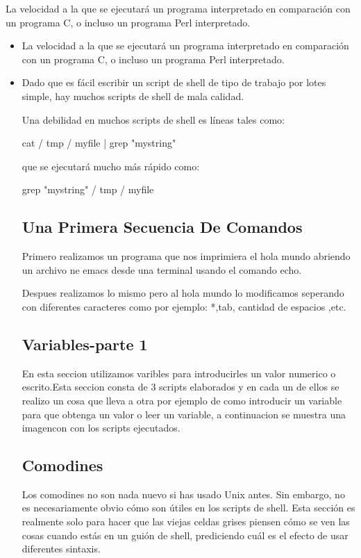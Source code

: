 \documentclass{article}
\begin{document}
La velocidad a la que se ejecutará un programa interpretado en comparación con un programa C, o incluso un programa Perl interpretado.
\begin{itemize}
\item La velocidad a la que se ejecutará un programa interpretado en comparación con un programa C, o incluso un programa Perl interpretado.

\item Dado que es fácil escribir un script de shell de tipo de trabajo por lotes simple, hay muchos scripts de shell de mala calidad.

Una debilidad en muchos scripts de shell es líneas tales como:

cat / tmp / myfile | grep "mystring"

que se ejecutará mucho más rápido como:

grep "mystring" / tmp / myfile  


\subsection{Una Primera Secuencia De Comandos}
Primero realizamos un programa que nos imprimiera el hola mundo abriendo un archivo ne emacs desde una terminal usando el comando echo.

Despues realizamos lo mismo pero al hola mundo lo modificamos seperando con diferentes caracteres como por ejemplo: *,tab, cantidad de espacios ,etc.


\subsection{Variables-parte 1}
En esta seccion utilizamos varibles para introducirles un valor numerico o escrito.Esta seccion consta de 3 scripts elaborados y en cada un de ellos se realizo un cosa que lleva a otra por ejemplo de como introducir un variable para que obtenga un valor o leer un variable, a continuacion se muestra una imagencon con los scripts ejecutados.



\subsection{Comodines}

Los comodines no son nada nuevo si has usado Unix antes. 
Sin embargo, no es necesariamente obvio cómo son útiles en los scripts de shell. Esta sección es realmente solo para hacer que las viejas celdas grises piensen cómo se ven las cosas cuando estás en un guión de shell, prediciendo cuál es el efecto de usar diferentes sintaxis.


\end{itemize}
\end{document}

